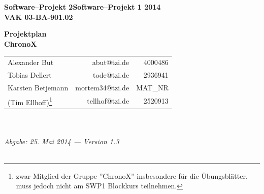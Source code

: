 \documentclass[fontsize=12pt,paper=a4,twoside]{scrartcl}
\newcommand{\swp}[0]{\ifthenelse{\boolean{langversion}}%
{Software--Projekt 2}{Software--Projekt 1}}
\newcommand{\jahr}[0]{2014}
\begin{document}
  \thispagestyle{fancy}
  \fancyhead[LO,RE]{ }
  \fancyfoot[C]{}

  \vspace{3cm}

 \begin{minipage}[H]{\textwidth}
  \begin{center}
  \bf
  \Large
  \swp{} \jahr\\
  \smallskip
  \small
  VAK 03-BA-901.02\\
  \vspace{3cm}
  \end{center}
  \end{minipage}
  \begin{minipage}[H]{\textwidth}
  \begin{center}
  \vspace{1cm}
  \bf
  {\Large Projektplan}\\
  \vspace{3ex}
  ChronoX\\%
  \vfill
  \end{center}
  \end{minipage}
  \vfill
  \begin{minipage}[H]{\textwidth}
  \begin{center}
  \sf
  \begin{tabular}{lrr}
  Alexander But & abut@tzi.de & 4000486\\
  Tobias Dellert & tode@tzi.de & 2936941\\
  Karsten Betjemann & mortem34@tzi.de & \color[rgb]{1,0,0} MAT\_NR\color[rgb]{0,0,0}\\
  (Tim Ellhoff)\footnote{zwar Mitglied der Gruppe ''ChronoX'' insbesondere für die Übungsblätter, muss jedoch nicht am SWP1 Blockkurs teilnehmen.} & tellhof@tzi.de & 2520913\\
  \end{tabular}
  \\ ~
  \vspace{2cm}
  \\
  \it Abgabe: 25. Mai 2014 --- Version 1.3\\ ~
  \end{center}
  \end{minipage}
\end{document}
